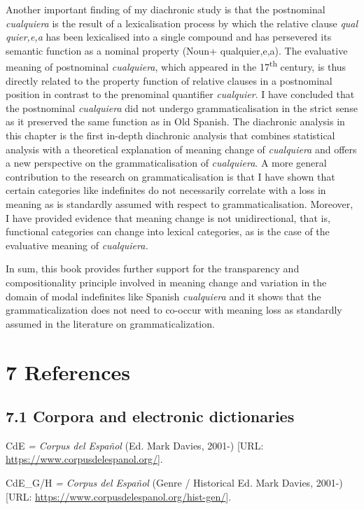   Another important finding of my diachronic study is that the postnominal \textit{cualquiera} is the result of a lexicalisation process by which the relative clause \textit{qual} \textit{quier,e,a} has been lexicalised into a single compound and has persevered its semantic function as a nominal property (Noun+ qualquier,e,a). The evaluative meaning of postnominal \textit{cualquiera}, which appeared in the 17\textsuperscript{th} century, is thus directly related to the property function of relative clauses in a postnominal position in contrast to the prenominal quantifier \textit{cualquier}. I have concluded that the postnominal \textit{cualquiera} did not undergo grammaticalisation in the strict sense as it preserved the same function as in Old Spanish. The diachronic analysis in this chapter is the first in-depth diachronic analysis that combines statistical analysis with a theoretical explanation of meaning change of \textit{cualquiera} and offers a new perspective on the grammaticalisation of \textit{cualquiera}. A more general contribution to the research on grammaticalisation is that I have shown that certain categories like indefinites do not necessarily correlate with a loss in meaning as is standardly assumed with respect to grammaticalisation. Moreover, I have provided evidence that meaning change is not unidirectional, that is, functional categories can change into lexical categories, as is the case of the evaluative meaning of \textit{cualquiera.} 

  In sum, this book provides further support for the transparency and compositionality principle involved in meaning change and variation in the domain of modal indefinites like Spanish \textit{cualquiera} and it shows that the grammaticalization does not need to co-occur with meaning loss as standardly assumed in the literature on grammaticalization. 

\chapter{\textbf{7} References}
\section{7.1 Corpora and electronic dictionaries}

CdE \textit{= Corpus del Español} (Ed. Mark Davies, 2001-) [URL: \url{https://www.corpusdelespanol.org/}].

CdE\_G/H \textit{= Corpus del Español} (Genre / Historical Ed. Mark Davies, 2001-) [URL: \url{https://www.corpusdelespanol.org/hist-gen/}].

